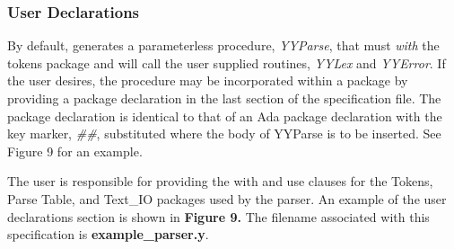 \subsubsection{User Declarations}
By default, \ayacc generates a parameterless procedure,
{\it YYParse},
that must {\it with} the tokens package and will call
the user supplied routines,
{\it YYLex}
and
{\it YYError}.
If the user desires, the procedure
may be incorporated within a package by providing a package
declaration in the last section of the specification file.  The package
declaration is identical to that of an Ada package
declaration with the key marker,
{\it \#\#},
substituted  where the body of YYParse is to be inserted.  See Figure 9 for
an example.

The user is responsible for providing the with and use clauses
for the Tokens, Parse Table, and Text\_IO packages used by the parser.  An
example of the user declarations section is shown in {\bf Figure 9.}  The filename
associated with this specification is {\bf example\_parser.y}.
\newpage
\noindent\hspace{-0.05in}\hrulefill\hspace{0.0in}\\
\vspace{-0.2in}

